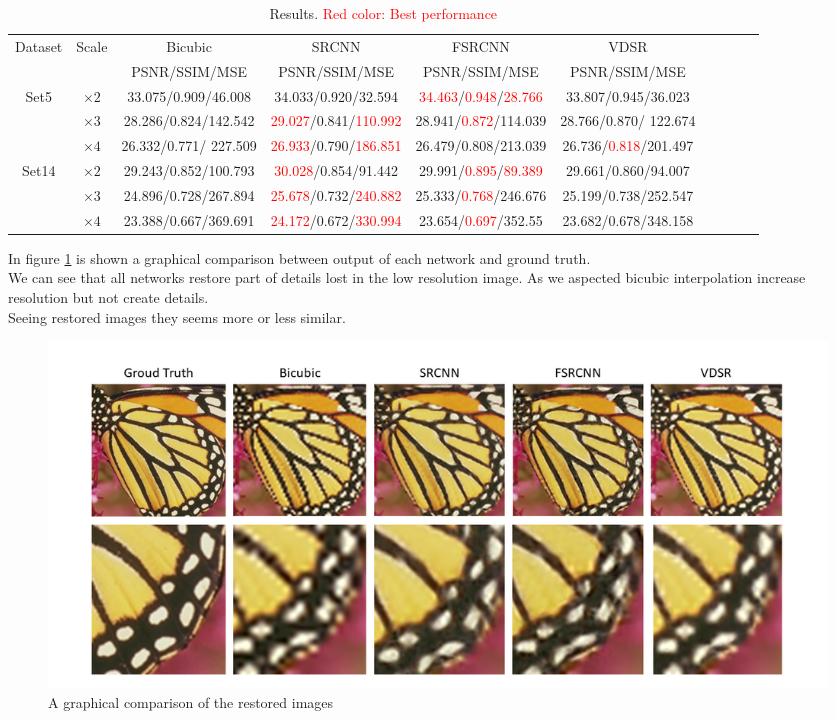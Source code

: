 \documentclass[10pt,twocolumn,letterpaper]{article}
\begin{document}
\begin{table}[h!]
\begin{center}
	\begin{tabular}{|c| c| c| c| c| c| c| c| c| c|} 
		
		\hline
		Dataset & Scale & Bicubic  & SRCNN & FSRCNN & VDSR\\ 
		 &  & PSNR/SSIM/MSE &PSNR/SSIM/MSE & PSNR/SSIM/MSE & PSNR/SSIM/MSE \\ 
		\hline
		\multirow{3}{*}{Set5} & $\times2$ & 33.075/0.909/46.008 & 34.033/0.920/32.594 & \textcolor{red}{34.463}/\textcolor{red}{0.948}/\textcolor{red}{28.766} & 33.807/0.945/36.023 \\
		 									& $\times3$ & 28.286/0.824/142.542 & \textcolor{red}{29.027}/0.841/\textcolor{red}{110.992} & 28.941/\textcolor{red}{0.872}/114.039 & 28.766/0.870/ 122.674\\
		 									& $\times4$ & 26.332/0.771/ 227.509 & \textcolor{red}{26.933}/0.790/\textcolor{red}{186.851} & 26.479/0.808/213.039 & 26.736/\textcolor{red}{0.818}/201.497 \\
		\hline
		\multirow{3}{*}{Set14} & $\times2$ & 29.243/0.852/100.793 & \textcolor{red}{30.028}/0.854/91.442 & 29.991/\textcolor{red}{0.895}/\textcolor{red}{89.389} & 29.661/0.860/94.007 \\
											& $\times3$ & 24.896/0.728/267.894 & \textcolor{red}{25.678}/0.732/\textcolor{red}{240.882} & 25.333/\textcolor{red}{0.768}/246.676 &25.199/0.738/252.547 \\
											& $\times4$ &23.388/0.667/369.691 & \textcolor{red}{24.172}/0.672/\textcolor{red}{330.994} & 23.654/\textcolor{red}{0.697}/352.55 & 23.682/0.678/348.158 \\
		\hline
	\end{tabular}
\label{results}
\end{center}
\caption{Results. \textcolor{red}{Red color: Best performance}}
\end{table}


In figure \ref{imgres} is shown a graphical comparison between output of each network and ground truth.\\
We can see that all networks restore part of details lost in the low resolution image. As we aspected bicubic interpolation increase resolution but not create details.\\
Seeing restored images they seems more or less similar.


\begin{figure}[h!]
	\centering
	\includegraphics[width=\textwidth]{img/RESULTS.png}
	\caption{A graphical comparison of the restored images}
	\label{imgres}
\end{figure}
\end{document}
